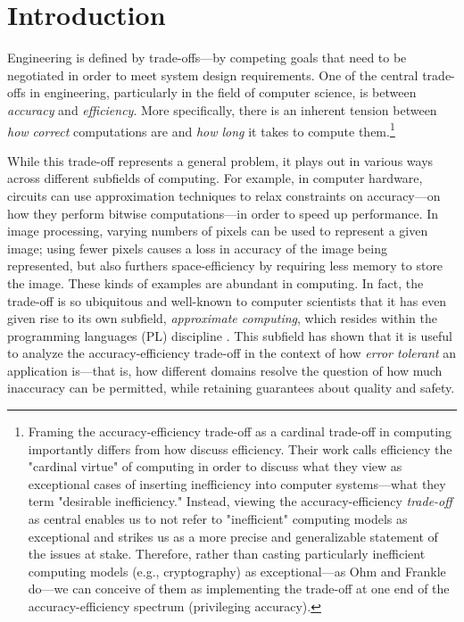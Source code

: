 \documentclass[sigplan,screen]{acmart}
\begin{document}
\section{Introduction} \label{sec:intro}
Engineering is defined by trade-offs---by competing goals that need to be negotiated in order to meet system design requirements. One of the central trade-offs in engineering, particularly in the field of computer science, is between \emph{accuracy} and \emph{efficiency}. More specifically, there is an inherent tension between \emph{how correct} computations are and \emph{how long} it takes to compute them.\footnote{Framing the accuracy-efficiency trade-off as a cardinal trade-off in computing importantly differs from how \citet{ohm70inefficiency} discuss efficiency. Their work calls efficiency the "cardinal virtue" of computing in order to discuss what they view as exceptional cases of inserting inefficiency into computer systems---what they term "desirable inefficiency." Instead, viewing the accuracy-efficiency \emph{trade-off} as central enables us to not refer to "inefficient" computing models as exceptional and strikes us as a more precise and generalizable statement of the issues at stake. Therefore, rather than casting particularly inefficient computing models (e.g., cryptography) as exceptional---as Ohm and Frankle do---we can conceive of them as implementing the trade-off at one end of the accuracy-efficiency spectrum (privileging accuracy).}

While this trade-off represents a general problem, it plays out in various ways across different subfields of computing. For example, in computer hardware, circuits can use approximation techniques to relax constraints on accuracy---on how they perform bitwise computations---in order to speed up performance. In image processing, varying numbers of pixels can be used to represent a given image; using fewer pixels causes a loss in accuracy of the image being represented, but also furthers space-efficiency by requiring less memory to store the image. These kinds of examples are abundant in computing. In fact, the trade-off is so ubiquitous and well-known to computer scientists that  it has even given rise to its own subfield, \emph{approximate computing}, which resides within the programming languages (PL) discipline \cite{moreau2018taxonomy, mittal2016apsurvey}. This subfield has shown that it is useful to analyze the accuracy-efficiency trade-off in the context of how \emph{error tolerant} an application is---that is, how different domains resolve the question of how much inaccuracy can be permitted, while retaining guarantees about quality and safety\cite{sampson2015thesis}.
\end{document}
